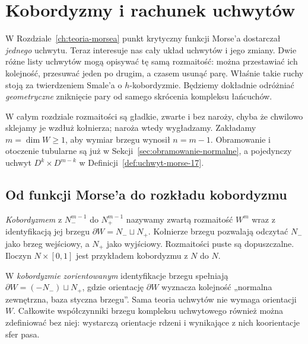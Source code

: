 \chapter{Kobordyzmy i rachunek uchwytów}
\label{ch:rachunek-uchwytow}

W Rozdziale~\ref{ch:teoria-morsea} punkt krytyczny
funkcji Morse'a dostarczał \emph{jednego} uchwytu.
Teraz interesuje nas cały układ uchwytów i jego
zmiany. Dwie różne listy uchwytów mogą opisywać tę
samą rozmaitość: można przestawiać ich kolejność,
przesuwać jeden po drugim, a czasem usunąć parę.
Właśnie takie ruchy stoją za twierdzeniem Smale'a
o $h$-kobordyzmie. Będziemy dokładnie odróżniać
\emph{geometryczne} zniknięcie pary od samego
skrócenia kompleksu łańcuchów.

W całym rozdziale rozmaitości są gładkie, zwarte
i bez naroży, chyba że chwilowo sklejamy je
wzdłuż kołnierza; naroża wtedy wygładzamy.
Zakładamy $m=\dim W\geq1$, aby wymiar brzegu wynosił
$n=m-1$. Obramowanie i otoczenie tubularne są już
w Sekcji~\ref{sec:obramowanie-normalne}, a pojedynczy
uchwyt $D^k\times D^{m-k}$ w
Definicji~\ref{def:uchwyt-morse-17}.

\section{Od funkcji Morse'a do rozkładu kobordyzmu}
\label{sec:kobordyzm-18}

\begin{definicja}[Kobordyzm]
\label{def:kobordyzm-18}
\emph{Kobordyzmem} z $N_-^{m-1}$ do
$N_+^{m-1}$ nazywamy zwartą rozmaitość $W^m$
wraz z identyfikacją jej brzegu
$\partial W=N_-\sqcup N_+$.
Kołnierze brzegu pozwalają odczytać $N_-$
jako brzeg wejściowy, a $N_+$ jako wyjściowy.
Rozmaitości puste są dopuszczalne. Iloczyn
$N\times[0,1]$ jest przykładem kobordyzmu
z $N$ do $N$.
\end{definicja}

W \emph{kobordyzmie zorientowanym} identyfikacje brzegu
spełniają $\partial W=(-N_-)\sqcup N_+$,
gdzie orientację $\partial W$ wyznacza kolejność
„normalna zewnętrzna, baza styczna brzegu”.
Sama teoria uchwytów nie wymaga orientacji $W$.
Całkowite współczynniki brzegu kompleksu uchwytowego
również można zdefiniować bez niej: wystarczą orientacje
rdzeni i wynikające z nich koorientacje sfer pasa.

